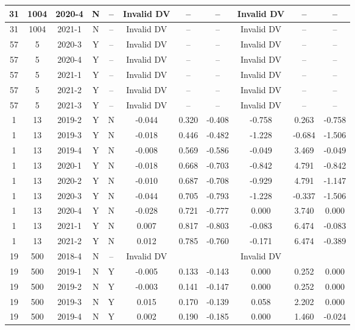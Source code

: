 \begin{landscape}
\begin{longtable}{@{}ccccc|ccc|ccc@{}}
31 & 1004 & 2020-4 & N & -- & Invalid DV & -- & -- & Invalid DV & -- & -- \\* \midrule
31 & 1004 & 2021-1 & N & -- & Invalid DV & -- & -- & Invalid DV & -- & -- \\* \midrule
57 & 5 & 2020-3 & Y & -- & Invalid DV & -- & -- & Invalid DV & -- & -- \\* \midrule
57 & 5 & 2020-4 & Y & -- & Invalid DV & -- & -- & Invalid DV & -- & -- \\* \midrule
57 & 5 & 2021-1 & Y & -- & Invalid DV & -- & -- & Invalid DV & -- & -- \\* \midrule
57 & 5 & 2021-2 & Y & -- & Invalid DV & -- & -- & Invalid DV & -- & -- \\* \midrule
57 & 5 & 2021-3 & Y & -- & Invalid DV & -- & -- & Invalid DV & -- & -- \\* \midrule
1 & 13 & 2019-2 & Y & N & -0.044 & 0.320 & -0.408 & -0.758 & 0.263 & -0.758 \\* \midrule
1 & 13 & 2019-3 & Y & N & -0.018 & 0.446 & -0.482 & -1.228 & -0.684 & -1.506 \\* \midrule
1 & 13 & 2019-4 & Y & N & -0.008 & 0.569 & -0.586 & -0.049 & 3.469 & -0.049 \\* \midrule
1 & 13 & 2020-1 & Y & N & -0.018 & 0.668 & -0.703 & -0.842 & 4.791 & -0.842 \\* \midrule
1 & 13 & 2020-2 & Y & N & -0.010 & 0.687 & -0.708 & -0.929 & 4.791 & -1.147 \\* \midrule
1 & 13 & 2020-3 & Y & N & -0.044 & 0.705 & -0.793 & -1.228 & -0.337 & -1.506 \\* \midrule
1 & 13 & 2020-4 & Y & N & -0.028 & 0.721 & -0.777 & 0.000 & 3.740 & 0.000 \\* \midrule
1 & 13 & 2021-1 & Y & N & 0.007 & 0.817 & -0.803 & -0.083 & 6.474 & -0.083 \\* \midrule
1 & 13 & 2021-2 & Y & N & 0.012 & 0.785 & -0.760 & -0.171 & 6.474 & -0.389 \\* \midrule
19 & 500 & 2018-4 & N & -- & Invalid DV &  &  & Invalid DV &  &  \\* \midrule
19 & 500 & 2019-1 & N & Y & -0.005 & 0.133 & -0.143 & 0.000 & 0.252 & 0.000 \\* \midrule
19 & 500 & 2019-2 & N & Y & -0.003 & 0.141 & -0.147 & 0.000 & 0.252 & 0.000 \\* \midrule
19 & 500 & 2019-3 & N & Y & 0.015 & 0.170 & -0.139 & 0.058 & 2.202 & 0.000 \\* \midrule
19 & 500 & 2019-4 & N & Y & 0.002 & 0.190 & -0.185 & 0.000 & 1.460 & -0.024 \\* \midrule

\end{longtable}
\end{landscape}
